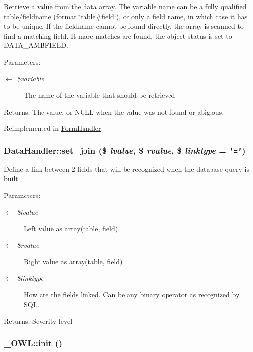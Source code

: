 Retrieve a value from the data array. The variable name can be a fully qualified table/fieldname (format \char`\"{}table\#field\char`\"{}), or only a field name, in which case it has to be unique. If the fieldname cannot be found directly, the array is scanned to find a matching field. It more matches are found, the object status is set to DATA\_\-AMBFIELD.

\begin{Desc}
\item[Parameters:]
\begin{description}
\item[\mbox{$\leftarrow$} {\em \$variable}]The name of the variable that should be retrieved \end{description}
\end{Desc}
\begin{Desc}
\item[Returns:]The value, or NULL when the value was not found or abigious. \end{Desc}


Reimplemented in \hyperlink{classFormHandler_371b8ded5110c6d66bc3a0c3e08fe085}{FormHandler}.\hypertarget{classDataHandler_9b77733f02e9d6281fc40df110c0ba70}{
\subsubsection{\setlength{\rightskip}{0pt plus 5cm}DataHandler::set\_\-join (\$ {\em lvalue}, \$ {\em rvalue}, \$ {\em linktype} = {\tt '='})}}
\label{classDataHandler_9b77733f02e9d6281fc40df110c0ba70}


Define a link between 2 fields that will be recognized when the database query is built.

\begin{Desc}
\item[Parameters:]
\begin{description}
\item[\mbox{$\leftarrow$} {\em \$lvalue}]Left value as array(table, field) \item[\mbox{$\leftarrow$} {\em \$rvalue}]Right value as array(table, field) \item[\mbox{$\leftarrow$} {\em \$linktype}]How are the fields linked. Can be any binary operator as recognized by SQL. \end{description}
\end{Desc}
\begin{Desc}
\item[Returns:]Severity level \end{Desc}
\hypertarget{class__OWL_e0ef3ded56e8a6b34b6461e5a721cd3e}{
\subsubsection{\setlength{\rightskip}{0pt plus 5cm}\_\-OWL::init ()}}
\label{class__OWL_e0ef3ded56e8a6b34b6461e5a721cd3e}


